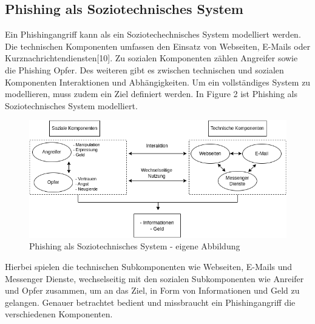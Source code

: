 \documentclass[journal=tosc,final]{iacrtrans}
\begin{document}
\subsection{Phishing als Soziotechnisches System}
Ein Phishingangriff kann als ein Soziotechechnisches System modelliert werden. Die technischen Komponenten umfassen den Einsatz von Webseiten, E-Mails oder Kurznachrichtendiensten[10]. Zu sozialen Komponenten zählen Angreifer sowie die Phishing Opfer. Des weiteren gibt es zwischen technischen und sozialen Komponenten Interaktionen und Abhängigkeiten. Um ein vollständiges System zu modellieren, muss zudem ein Ziel definiert werden. In Figure 2 ist Phishing als Soziotechnisches System modelliert.
\begin{center}
 \begin{figure}[h]
  \caption{Phishing als Soziotechnisches System - eigene Abbildung}
  \includegraphics[scale=0.5]{syst.png}
 \end{figure}
\end{center}
Hierbei spielen die technischen Subkomponenten wie Webseiten, E-Mails und Messenger Dienste, wechselseitig mit den sozialen Subkomponenten wie Anreifer und Opfer zusammen, um an das Ziel, in Form von Informationen und Geld zu gelangen. Genauer  betrachtet bedient und missbraucht ein Phishingangriff die verschiedenen Komponenten. 
\end{document}
